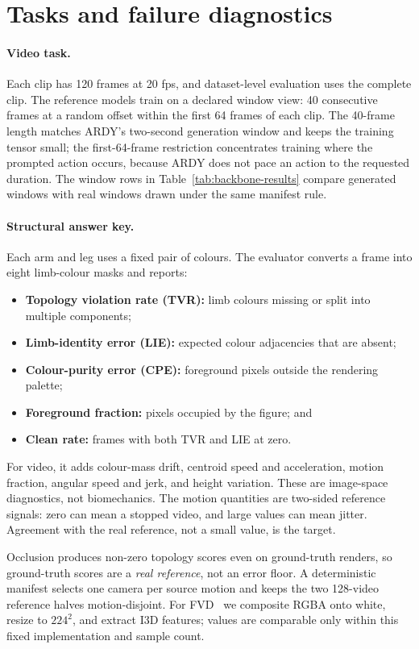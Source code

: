 \documentclass[10pt,twocolumn]{article}
\begin{document}
\section{Tasks and failure diagnostics}
\paragraph{Video task.} Each clip has 120 frames at 20 fps, and dataset-level evaluation uses the complete
clip. The reference models train on a declared window view: 40 consecutive frames at a random offset within the
first 64 frames of each clip. The 40-frame length matches ARDY's two-second generation window and keeps the
training tensor small; the first-64-frame restriction concentrates training where the prompted action occurs,
because ARDY does not pace an action to the requested duration. The window rows in
Table~\ref{tab:backbone-results} compare generated windows with real windows drawn under the same manifest
rule.

\paragraph{Structural answer key.} Each arm and leg uses a fixed pair of colours. The evaluator converts a
frame into eight limb-colour masks and reports:
\begin{itemize}\setlength\itemsep{0pt}
    \item \textbf{Topology violation rate (TVR):} limb colours missing or split into multiple components;
    \item \textbf{Limb-identity error (LIE):} expected colour adjacencies that are absent;
    \item \textbf{Colour-purity error (CPE):} foreground pixels outside the rendering palette;
    \item \textbf{Foreground fraction:} pixels occupied by the figure; and
    \item \textbf{Clean rate:} frames with both TVR and LIE at zero.
\end{itemize}
For video, it adds colour-mass drift, centroid speed and acceleration, motion fraction, angular speed and
jerk, and height variation. These are image-space diagnostics, not biomechanics. The motion quantities are
two-sided reference signals: zero can mean a stopped video, and large values can mean jitter. Agreement with
the real reference, not a small value, is the target.

Occlusion produces non-zero topology scores even on ground-truth renders, so ground-truth scores are a
\emph{real reference}, not an error floor. A deterministic manifest selects one camera per source motion and
keeps the two 128-video reference halves motion-disjoint. For FVD~\cite{unterthiner2018fvd} we composite RGBA
onto white, resize to $224^2$, and extract I3D features; values are comparable only within this fixed
implementation and sample count.
\end{document}
